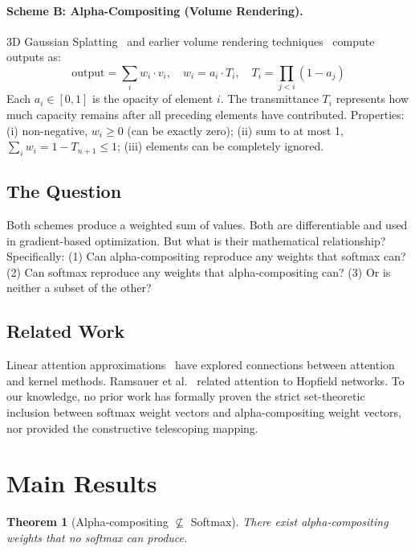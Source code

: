 \documentclass[11pt]{article}
\newtheorem{theorem}{Theorem}
\begin{document}
\paragraph{Scheme B: Alpha-Compositing (Volume Rendering).}
3D Gaussian Splatting~\cite{kerbl2023} and earlier volume rendering techniques~\cite{porter1984,max1995} compute outputs as:
\begin{equation}
\text{output} = \sum_i w_i \cdot v_i, \quad w_i = a_i \cdot T_i, \quad T_i = \prod_{j < i}(1 - a_j)
\end{equation}
Each $a_i \in [0,1]$ is the opacity of element $i$. The transmittance $T_i$ represents how much capacity remains after all preceding elements have contributed. Properties: (i) non-negative, $w_i \geq 0$ (can be exactly zero); (ii) sum to at most 1, $\sum_i w_i = 1 - T_{n+1} \leq 1$; (iii) elements can be completely ignored.

\subsection{The Question}

Both schemes produce a weighted sum of values. Both are differentiable and used in gradient-based optimization. But what is their mathematical relationship? Specifically: (1) Can alpha-compositing reproduce any weights that softmax can? (2) Can softmax reproduce any weights that alpha-compositing can? (3) Or is neither a subset of the other?

\subsection{Related Work}

Linear attention approximations~\cite{katharopoulos2020} have explored connections between attention and kernel methods. Ramsauer et al.~\cite{ramsauer2021} related attention to Hopfield networks. To our knowledge, no prior work has formally proven the strict set-theoretic inclusion between softmax weight vectors and alpha-compositing weight vectors, nor provided the constructive telescoping mapping.

\section{Main Results}

\begin{theorem}[Alpha-compositing $\not\subseteq$ Softmax]
\label{thm:alpha-not-subset}
There exist alpha-compositing weights that no softmax can produce.
\end{theorem}
\end{document}
